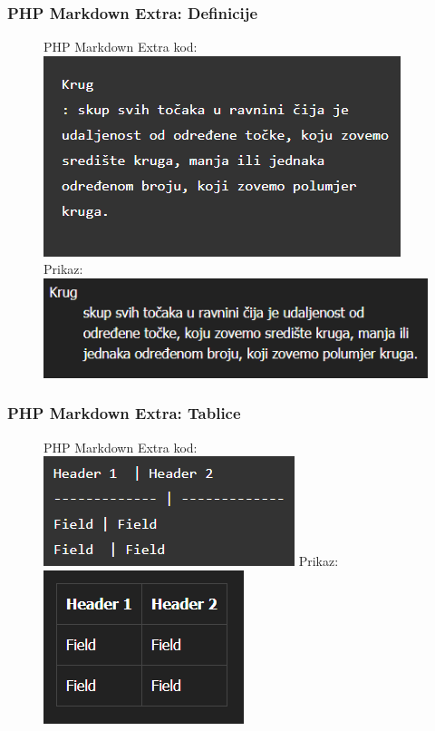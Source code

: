 \documentclass{beamer}
\begin{document}
\newpage


\begin{frame}
\frametitle{PHP Markdown Extra: Definicije}
\begin{figure}
\centering
{PHP Markdown Extra kod:}
\newline
\newline
\centering
\includegraphics[width = 0.5\linewidth]{definicije1.png}
\newline
\newline
\centering
{Prikaz:}
\newline
\newline
\centering
\includegraphics[width = 0.5\linewidth]{definicije2.png}
\end{figure}
\end{frame}


\newpage


\begin{frame}
\frametitle{PHP Markdown Extra: Tablice}
\begin{figure}
\centering
{PHP Markdown Extra kod:}
\newline
\newline
\centering
\includegraphics[width = 0.5\linewidth]{tablica1.png}
\newline
\newline
\centering
{Prikaz:}
\newline
\newline
\centering
\includegraphics[width = 0.3\linewidth]{tablica2.png}
\end{figure}
\end{frame}
\end{document}

